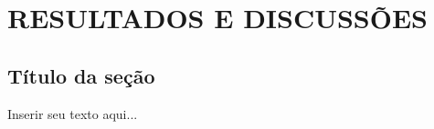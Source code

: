 
\chapter{RESULTADOS E DISCUSSÕES}
\label{chap:resultados}

\section{Título da seção}
\label{sec:Result1}

Inserir seu texto aqui...